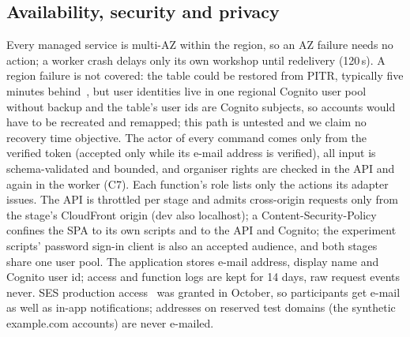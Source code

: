\subsection{Availability, security and privacy}
Every managed service is multi-AZ within the region, so an AZ failure needs no action; a worker
crash delays only its own workshop until redelivery (120\,s). A region failure is not covered: the
table could be restored from PITR, typically five minutes behind~\cite{aws-ddb-pitr-howitworks}, but
user identities live in one regional Cognito user pool without backup and the table's user ids are
Cognito subjects, so accounts would have to be recreated and remapped; this path is untested and we
claim no recovery time objective. The actor of every command comes only from the verified token
(accepted only while its e-mail address is verified), all input is schema-validated and bounded,
and organiser rights are checked in the API and again in the worker (C7). Each function's role
lists only the actions its adapter issues. The API is throttled per stage and admits cross-origin
requests only from the stage's CloudFront origin (dev also localhost); a Content-Security-Policy
confines the SPA to its own scripts and to the API and Cognito; the experiment scripts' password sign-in client is
also an accepted audience, and both stages share one user pool. The application stores e-mail
address, display name and Cognito user id; access and function logs are kept for 14 days, raw
request events never. SES production access~\cite{aws-ses-production-access} was granted in
October, so participants get e-mail as well as in-app notifications; addresses on reserved test
domains (the synthetic example.com accounts) are never e-mailed.
